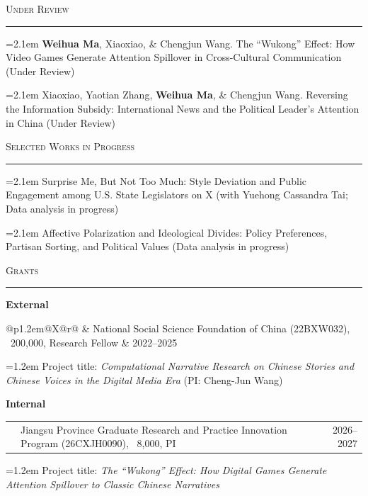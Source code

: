 \documentclass[10pt,letterpaper]{article}
\makeatletter
\newcommand{\cvsection}[1]{%
  \par
  \Needspace{4\baselineskip}%
  \vspace{0.66em}%
  {\Large\scshape #1}\par\nobreak
  \vspace{0.28em}%
  \hrule\nobreak
  \vspace{0.40em}%
}
\newcommand{\pub}[2]{%
  \par
  \hangindent=2.1em
  \hangafter=1
  \makebox[2.1em][l]{[#1]}#2%
  \par\vspace{0.34em}%
}
\newcommand{\cvbullet}[2]{%
  \par\noindent
  \begin{tabularx}{\linewidth}{
    @{}p{1.2em}@{}X@{\hspace{0.6em}}r@{}
  }
    \textbullet & #1 & #2
  \end{tabularx}%
  \par\vspace{0.34em}%
}
\newcommand{\cvproject}[1]{%
  \par
  {\leftskip=1.2em
  \noindent #1\par}%
}
\makeatother
\begin{document}

\cvsection{Under Review}

\pub{2}{
  \textbf{Weihua Ma}, Xiaoxiao,
  \& Chengjun Wang.
  The ``Wukong'' Effect: How Video Games
  Generate Attention Spillover in
  Cross-Cultural Communication
  (Under Review)
}

\pub{1}{
  Xiaoxiao, Yaotian Zhang,
  \textbf{Weihua Ma}, \& Chengjun Wang.
  Reversing the Information Subsidy:
  International News and the Political
  Leader's Attention in China
  (Under Review)
}


\cvsection{Selected Works in Progress}

\pub{2}{
  Surprise Me, But Not Too Much:
  Style Deviation and Public Engagement
  among U.S. State Legislators on X
  (with Yuehong Cassandra Tai;
  Data analysis in progress)
}

\pub{1}{
  Affective Polarization and Ideological
  Divides: Policy Preferences,
  Partisan Sorting, and Political Values
  (Data analysis in progress)
}


\cvsection{Grants}

\textbf{External}
\par\vspace{0.14em}

\cvbullet{
  National Social Science Foundation
  of China (22BXW032),
  \textyen\ 200,000, Research Fellow
}{2022--2025}

\cvproject{
  Project title:
  \textit{Computational Narrative Research
  on Chinese Stories and Chinese Voices
  in the Digital Media Era}
  (PI: Cheng-Jun Wang)
}

\vspace{0.30em}

\textbf{Internal}
\par\vspace{0.14em}

\cvbullet{
  Jiangsu Province Graduate Research and
  Practice Innovation Program (26CXJH0090),
  \textyen\ 8,000, PI
}{2026--2027}

\cvproject{
  Project title:
  \textit{The ``Wukong'' Effect:
  How Digital Games Generate Attention
  Spillover to Classic Chinese Narratives}
}

\end{document}
